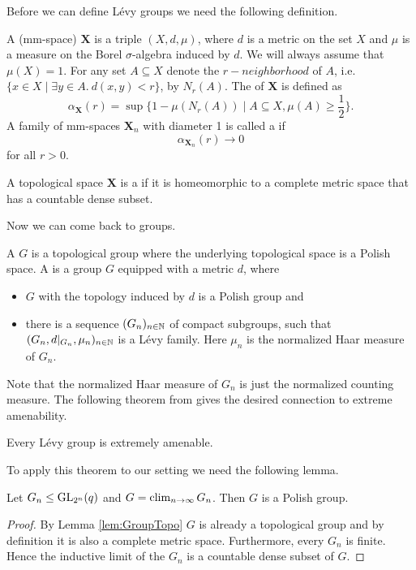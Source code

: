 Before we can define L\'evy groups we need the following definition.
\begin{definition}
A  (mm-space) $\boldsymbol{X}$ is a triple $(X,d,\mu)$, where $d$ is a metric on the set $X$ and $\mu$ is a measure on the Borel $\sigma$-algebra induced by $d$. We will always assume that $\mu(X)=1$. 
For any set $A\subseteq X$ denote the $r-neighborhood$ of $A$, i.e. $\{x\in X\mid\exists y\in A.\  d(x,y)<r\}$, by $N_r(A)$.
The  of $\boldsymbol{X}$ is defined as 
\[\alpha_{\boldsymbol{X}}(r)=\sup\{1-\mu(N_r(A))\mid A\subseteq X, \mu(A)\geq\frac{1}{2}\}.\]
A family of mm-spaces $\boldsymbol{X}_n$ with diameter 1 is called a  if 
\[\alpha_{\boldsymbol{X}_n}(r)\to 0\]
for all $r>0$.

A topological space $\boldsymbol{X}$ is a  if it is homeomorphic to a complete metric space that has a countable dense subset.
\end{definition}

Now we can come back to groups.
\begin{definition}
A  $G$ is a topological group where the underlying topological space is a Polish space. A  is a group $G$ equipped with a metric $d$, where
\begin{itemize}
\item $G$ with the topology induced by $d$ is a Polish group and
\item there is a sequence $(G_n)_{n\in\mathbb{N}}$ of compact subgroups, such that $(G_n,d|_{G_n},\mu_n)_{n\in\mathbb{N}}$ is a L\'evy family. Here $\mu_n$ is the normalized Haar measure of $G_n$.
\end{itemize}  
\end{definition}
Note that the normalized Haar measure of $G_n$ is just the normalized counting measure.
The following theorem from \cite{Levy} gives the desired connection to extreme amenability.
\begin{theorem}\label{thm:LevyImpliesExAm}
Every L\'evy group is extremely amenable.
\end{theorem}

To apply this theorem to our setting we need the following lemma.
\begin{lemma}
Let $G_n\leq\operatorname{GL}_{2^n}(q)$ and $G=\operatorname{clim}\limits_{n\to\infty} G_n$. Then $G$ is a Polish group. 
\end{lemma}
\begin{proof}
By Lemma \ref{lem:GroupTopo} $G$ is already a topological group and by definition it is also a complete metric space. Furthermore, every $G_n$ is finite. Hence the inductive limit of the $G_n$ is a countable dense subset of $G$.
\end{proof}

